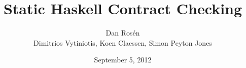 \documentclass[serif,professionalfont]{beamer}
\title{ {\huge Static Haskell Contract Checking} }
\institute{ Microsoft Research }
\author{ {\Large Dan Ros\'en}
     \vspace{\baselineskip} \\
     Dimitrios Vytiniotis, Koen Claessen, Simon Peyton Jones}
\date{September 5, 2012}
\begin{document}
\maketitle
\makeatactive

\newcommand{\unitcpo}{{\sf{\bf 1}}}
\newcommand{\Th}[0]{{\cal T}}
\newcommand{\alttr}[1]{#1^{m}}
\newcommand{\ol}[1]{\overline{#1}}
\newcommand{\Ct}{{\tt C}}
\newcommand{\CF}{{\tt CF}}
\newcommand{\roll}[1]{#1}
\newcommand{\unroll}[1]{#1}
\newcommand{\bind}[2]{#1(#2)}
\newcommand{\ret}[1]{#1}
\newcommand{\injK}[2]{\mathsf{#1}(#2)}
\newcommand{\injKZ}[1]{\mathsf{#1}}
\newcommand{\injFun}[1]{\mathsf{Fun}(#1)}
\newcommand{\injBad}{\mathsf{Bad}}
\newcommand{\dbrace}[1]{[\![#1]\!]}
\newcommand{\Fcf}{F_{\lcfZ}}
\newcommand{\lcfZ}{\textsf{cf}}
\newcommand{\dapp}{\mathsf{app}}
\newcommand\cf[0]{\mathsf{CF}}
\newcommand\conj[0]{\&}
\newcommand\cons[2]{\mathsf{cons}(#1,#2)}
\newcommand\conspi[1]{\mathsf{cons_0}(#1)}
\newcommand\conspii[1]{\mathsf{cons_1}(#1)}
\newcommand\nil[0]{\mathsf{nil}}
\newcommand\head[1]{\mathsf{head}(#1)}
\newcommand\maps[0]{\mathsf{map}}
\newcommand\map[2]{\maps(#1,#2)}
\newcommand\ptr[1]{#1_\mathsf{ptr}}
\newcommand\appsym[0]{\mathsf{app}}
\newcommand\app[2]{\appsym(#1,#2)}
\newcommand\appp[3]{\app{\app{#1}{#2}}{#3}}
\newcommand\unr[0]{@UNR@}
\newcommand\True[0]{@True@}
\newcommand\False[0]{@False@}
\newcommand\bad[0]{@BAD@}
\newcommand\formula[1]{#1}
\newcommand\highlight[1]{#1}
\newcommand{\taus}{\ol{\tau}}
\newcommand{\interp}[3]{[\![#1]\!]} %
\newcommand{\etrans}[3]{{\cal E}\{\!\!\{#3\}\!\!\}}
\newcommand{\ptrans}[2]{{\cal P}\{\!\!\{#2\}\!\!\}}
\newcommand{\trc}[1]{{\cal C}\{\!\!\{#1\}\!\!\}}
\newcommand\Min[0]{\mathsf{min}}
\end{document}
